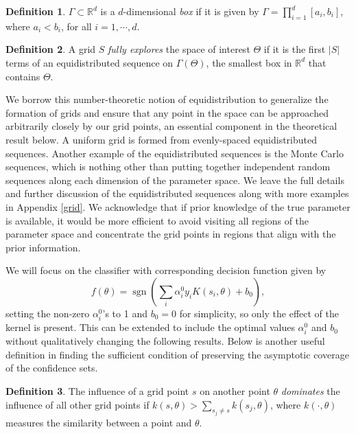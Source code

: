 \documentclass[12pt]{article}
\DeclareMathOperator{\sgn}{sgn}
\theoremstyle{definition}
\newtheorem{definition}{Definition}
\begin{document}
\begin{definition}
    $\Gamma\subset \mathbb{R}^d$ is a $d$-dimensional \textit{box} if it is given by $\Gamma=\prod_{i=1}^d [a_i,b_i]$, where $a_i<b_i$, for all $i=1, \cdots, d$. 
\end{definition}

\begin{definition}\label{def:explore}
A grid $S$ \textit{fully explores} the space of interest $\Theta$ if it is the first $|S|$ terms of an equidistributed sequence on $\Gamma(\Theta)$, the smallest box in $\mathbb{R}^d$ that contains $\Theta$.
\end{definition}
\noindent
We borrow this number-theoretic notion of equidistribution to generalize the formation of grids and ensure that any point in the space can be approached arbitrarily closely by our grid points, an essential component in the theoretical result below. A uniform grid is formed from evenly-spaced equidistributed sequences. Another example of the equidistributed sequences is the Monte Carlo sequences, which is nothing other than putting together independent random sequences along each dimension of the parameter space. We leave the full details and further discussion of the equidistributed sequences along with more examples in Appendix \ref{grid}. We acknowledge that if prior knowledge of the true parameter is available, it would be more efficient to avoid visiting all regions of the parameter space and concentrate the grid points in regions that align with the prior information.

We will focus on the classifier with corresponding decision function given by 
\begin{equation}\label{decision_func}
f(\theta)=\sgn\left(\sum_i \alpha_i^0 y_i K(s_i,\theta)+b_0\right),
\end{equation}
setting the non-zero $\alpha_i^0$'s to 1 and $b_0=0$ for simplicity, so only the effect of the kernel is present. This can be extended to include the optimal values $\alpha_i^0$ and $b_0$ without qualitatively changing the following results. Below is another useful definition in finding the sufficient condition of preserving the asymptotic coverage of the confidence sets.

\begin{definition}
The influence of a grid point $s$ on another point 
$\theta$ \textit{dominates} the influence of all other grid points if $k(s,\theta)>\sum_{s_j\neq s}k(s_j,\theta)$, where $k(\cdot,\theta)$ measures the similarity between a point and $\theta$.
\end{definition}
\end{document}
